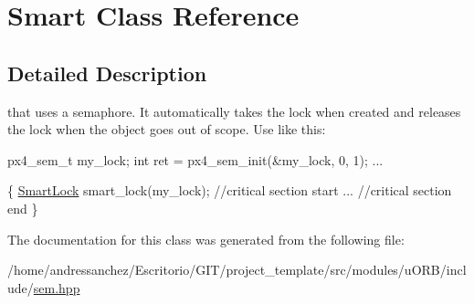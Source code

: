 \hypertarget{classSmart}{}\section{Smart Class Reference}
\label{classSmart}


\subsection{Detailed Description}
that uses a semaphore. It automatically takes the lock when created and releases the lock when the object goes out of scope. Use like this\+:

px4\+\_\+sem\+\_\+t my\+\_\+lock; int ret = px4\+\_\+sem\+\_\+init(\&my\+\_\+lock, 0, 1); ...

\{ \hyperlink{classSmartLock}{Smart\+Lock} smart\+\_\+lock(my\+\_\+lock); //critical section start ... //critical section end \} 

The documentation for this class was generated from the following file\+:\begin{DoxyCompactItemize}
\item 
/home/andressanchez/\+Escritorio/\+G\+I\+T/project\+\_\+template/src/modules/u\+O\+R\+B/include/\hyperlink{sem_8hpp}{sem.\+hpp}\end{DoxyCompactItemize}
